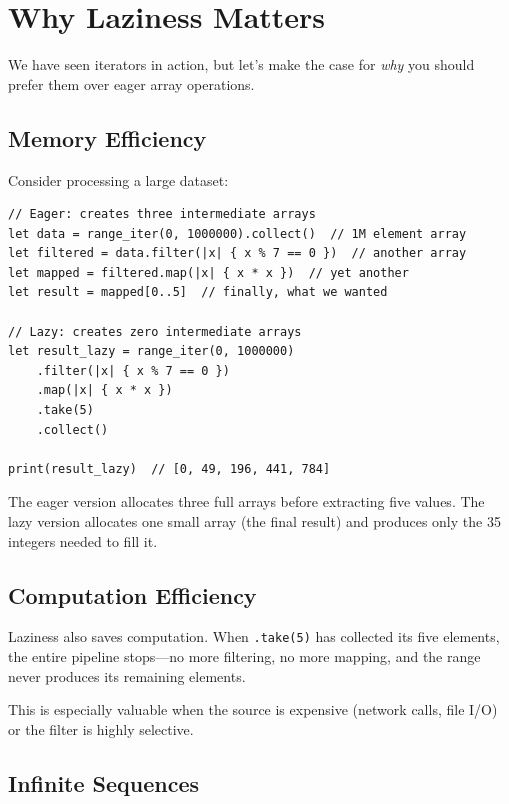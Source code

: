 \section{Why Laziness Matters}\label{sec:why-laziness}

We have seen iterators in action, but let's make the case for \emph{why} you should prefer them over eager array operations.

\subsection{Memory Efficiency}\label{subsec:lazy-memory}

Consider processing a large dataset:

\begin{lstlisting}[language=Lattice, caption={Eager vs.\ lazy memory usage}]
// Eager: creates three intermediate arrays
let data = range_iter(0, 1000000).collect()  // 1M element array
let filtered = data.filter(|x| { x % 7 == 0 })  // another array
let mapped = filtered.map(|x| { x * x })  // yet another
let result = mapped[0..5]  // finally, what we wanted

// Lazy: creates zero intermediate arrays
let result_lazy = range_iter(0, 1000000)
    .filter(|x| { x % 7 == 0 })
    .map(|x| { x * x })
    .take(5)
    .collect()

print(result_lazy)  // [0, 49, 196, 441, 784]
\end{lstlisting}

The eager version allocates three full arrays before extracting five values.
The lazy version allocates one small array (the final result) and produces only the 35 integers needed to fill it.

\subsection{Computation Efficiency}\label{subsec:lazy-computation}

Laziness also saves computation.
When \lstinline|.take(5)| has collected its five elements, the entire pipeline stops---no more filtering, no more mapping, and the range never produces its remaining elements.

This is especially valuable when the source is expensive (network calls, file I/O) or the filter is highly selective.

\subsection{Infinite Sequences}\label{subsec:infinite-sequences}


